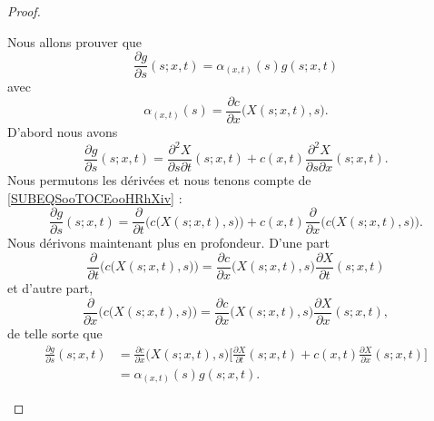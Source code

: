 \begin{proof}
\begin{subproof}
\begin{subproof}
            Nous allons prouver que
            \begin{equation}
                \frac{ \partial g }{ \partial s }(s;x,t)=\alpha_{(x,t)}(s)g(s;x,t)
            \end{equation}
            avec
            \begin{equation}
                \alpha_{(x,t)}(s)=\frac{ \partial c }{ \partial x }\big( X(s;x,t),s \big).
            \end{equation}
            D'abord nous avons
            \begin{equation}
                \frac{ \partial g }{ \partial s }(s;x,t)=\frac{ \partial^2X }{ \partial s\partial t }(s;x,t)+c(x,t)\frac{ \partial^2X }{ \partial s\partial x }(s;x,t).
            \end{equation}
            Nous permutons les dérivées et nous tenons compte de \eqref{SUBEQSooTOCEooHRhXiv} :
            \begin{equation}
                \frac{ \partial g }{ \partial s }(s;x,t)=\frac{ \partial  }{ \partial t }\Big( c\big( X(s;x,t),s \big) \Big)+c(x,t)\frac{ \partial  }{ \partial x }\Big( c\big( X(s;x,t),s \big) \Big).
            \end{equation}
            Nous dérivons maintenant plus en profondeur. D'une part
            \begin{equation}
                \frac{ \partial  }{ \partial t }\Big( c\big( X(s;x,t),s \big) \Big)=\frac{ \partial c }{ \partial x }\Big( X(s;x,t),s \Big)\frac{ \partial X }{ \partial t }(s;x,t)
            \end{equation}
            et d'autre part,
            \begin{equation}
                \frac{ \partial  }{ \partial x }\Big( c\big( X(s;x,t),s \big) \Big)=\frac{ \partial c }{ \partial x }\Big( X(s;x,t),s \Big)\frac{ \partial X }{ \partial x }(s;x,t),
            \end{equation}
            de telle sorte que
            \begin{subequations}
                \begin{align}
                \frac{ \partial g }{ \partial s }(s;x,t)&=\frac{ \partial c }{ \partial x }\big( X(s;x,t),s \big)\Big[ \frac{ \partial X }{ \partial t }(s;x,t)+c(x,t)\frac{ \partial X }{ \partial x }(s;x,t) \Big]\\
                &=\alpha_{(x,t)}(s)g(s;x,t).
                \end{align}
            \end{subequations}


\end{subproof}
\end{subproof}
\end{proof}
